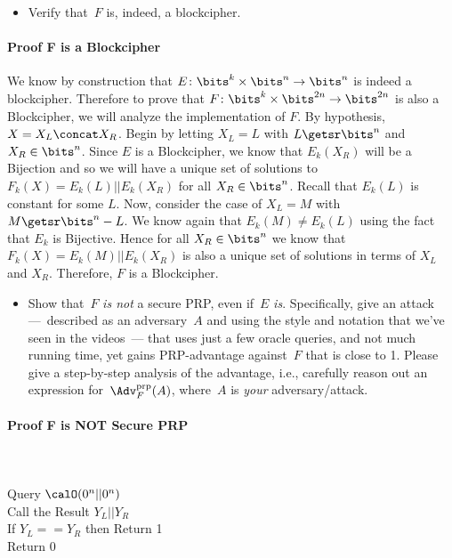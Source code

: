 \documentclass[11pt]{article}
\newcommand{\AdvPRP}[2]{\Adv^{\mathrm{prp}}_{#1}(#2)}
\begin{document}
\begin{itemize}
\item Verify that~$F$ is, indeed, a blockcipher.
\end{itemize}

\paragraph{Proof F is a Blockcipher}
We know by construction that $E \colon \bits^k \times \bits^n \to \bits^n$ is indeed a blockcipher. Therefore to prove that $F \colon \bits^k \times \bits^{2n}
\to \bits^{2n}$ is also a Blockcipher, we will analyze the implementation of $F$. By hypothesis,  $X = X_L \concat X_R$. Begin by letting $X_L = L$ with $L \getsr \bits^n$ and $X_R \in \bits^n$. Since $E$ is a Blockcipher, we know that $E_k(X_R)$ will be a Bijection and so we will have a unique set of solutions to $F_k(X) = E_k({L}) || E_k(X_R)$ for all $X_R \in \bits^{n}$. Recall that $E_k({L})$ is constant for some $L$. Now, consider the case of $X_L = M$ with $M \getsr \bits^n - {L}$. We know again that $E_k(M) \neq E_k(L)$ using the fact that $E_k$ is Bijective. Hence for all $X_R \in \bits^n$ we know that $F_k(X) = E_k(M) || E_k(X_R)$ is also a unique set of solutions in terms of $X_L$ and $X_R$. Therefore, $F$ is  a Blockcipher.

\begin{itemize}
\item Show that~$F$ \emph{is not} a secure PRP, even if~$E$
  \emph{is}.  Specifically, give an attack ---~described as an
  adversary~$A$ and using the style and notation that we've seen in
  the videos~--- that uses just a few oracle queries, and not much
  running time, yet gains PRP-advantage against~$F$ that is close to
  1.  Please give a step-by-step analysis of the advantage, i.e.,
  carefully reason out an expression for~$\AdvPRP{F}{A}$, where~$A$ is
  \emph{your} adversary/attack. 
\end{itemize}

\paragraph{Proof F is NOT Secure PRP}\quad
\\


\\
Query $\calO(0^n || 0^n)$\\
Call the Result $Y_L || Y_R$\\
If $Y_L == Y_R$ then Return 1\\
Return 0\\
\end{document}
